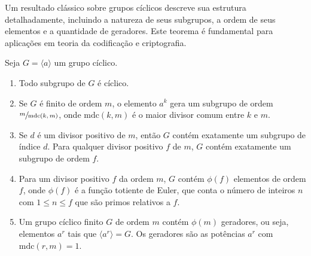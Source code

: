Um resultado clássico sobre grupos cíclicos descreve sua estrutura
detalhadamente, incluindo a natureza de seus subgrupos, a ordem de seus
elementos e a quantidade de geradores. Este teorema é fundamental para
aplicações em teoria da codificação e criptografia.

\begin{theorem}
Seja $G = \langle a \rangle$ um grupo cíclico.
\begin{enumerate}
    \item[(i)] Todo subgrupo de $G$ é cíclico.
    \item[(ii)] Se $G$ é finito de ordem $m$, o elemento $a^k$ gera um subgrupo
      de ordem $\sfrac{m}{\text{mdc}(k, m)}$, onde $\text{mdc}(k, m)$ é o maior
      divisor comum entre $k$ e $m$.
    \item[(iii)] Se $d$ é um divisor positivo de $m$, então $G$ contém
      exatamente um subgrupo de índice $d$. Para qualquer divisor positivo $f$
      de $m$, $G$ contém exatamente um subgrupo de ordem $f$.
    \item[(iv)] Para um divisor positivo $f$ da ordem $m$, $G$ contém $\phi(f)$
      elementos de ordem $f$, onde $\phi(f)$ é a função totiente de Euler, que
      conta o número de inteiros $n$ com $1 \leq n \leq f$ que são primos
      relativos a $f$.
    \item[(v)] Um grupo cíclico finito $G$ de ordem $m$ contém $\phi(m)$
      geradores, ou seja, elementos $a^r$ tais que $\langle a^r \rangle = G$.
      Os geradores são as potências $a^r$ com $\text{mdc}(r, m) = 1$.
\end{enumerate}
\end{theorem}


